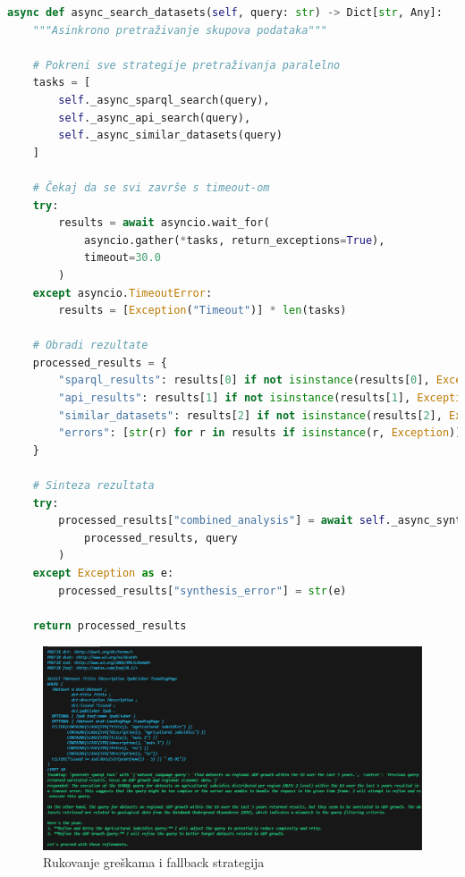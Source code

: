 \begin{lstlisting}[language=Python, caption=Implementacija asinkrone obrade]
async def async_search_datasets(self, query: str) -> Dict[str, Any]:
    """Asinkrono pretraživanje skupova podataka"""
    
    # Pokreni sve strategije pretraživanja paralelno
    tasks = [
        self._async_sparql_search(query),
        self._async_api_search(query),
        self._async_similar_datasets(query)
    ]
    
    # Čekaj da se svi završe s timeout-om
    try:
        results = await asyncio.wait_for(
            asyncio.gather(*tasks, return_exceptions=True),
            timeout=30.0
        )
    except asyncio.TimeoutError:
        results = [Exception("Timeout")] * len(tasks)
    
    # Obradi rezultate
    processed_results = {
        "sparql_results": results[0] if not isinstance(results[0], Exception) else [],
        "api_results": results[1] if not isinstance(results[1], Exception) else [],
        "similar_datasets": results[2] if not isinstance(results[2], Exception) else [],
        "errors": [str(r) for r in results if isinstance(r, Exception)]
    }
    
    # Sinteza rezultata
    try:
        processed_results["combined_analysis"] = await self._async_synthesize_results(
            processed_results, query
        )
    except Exception as e:
        processed_results["synthesis_error"] = str(e)
    
    return processed_results
\end{lstlisting}

\begin{figure}[htbp]
    \centering
    \includegraphics[width=1\textwidth]{figures/izvjestaj_image_68.png}
    \caption{Rukovanje greškama i fallback strategija}
    \label{fig:error_handling}
\end{figure} 
